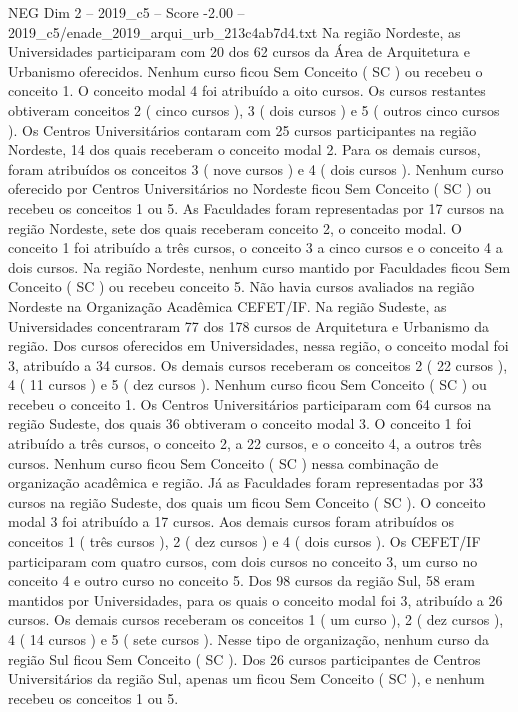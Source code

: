 \begin{textsample}{NEG Dim 2 – 2019\_c5 – Score -2.00 – 2019\_c5/enade\_2019\_arqui\_urb\_213c4ab7d4.txt}
Na região Nordeste, as Universidades participaram com 20 dos 62 cursos da Área de Arquitetura e Urbanismo oferecidos.
Nenhum curso ficou Sem Conceito ( SC ) ou recebeu o conceito 1.
O conceito modal 4 foi atribuído a oito cursos.
Os cursos restantes obtiveram conceitos 2 ( cinco cursos ), 3 ( dois cursos ) e 5 ( outros cinco cursos ).
Os Centros Universitários contaram com 25 cursos participantes na região Nordeste, 14 dos quais receberam o conceito modal 2.
Para os demais cursos, foram atribuídos os conceitos 3 ( nove cursos ) e 4 ( dois cursos ).
Nenhum curso oferecido por Centros Universitários no Nordeste ficou Sem Conceito ( SC ) ou recebeu os conceitos 1 ou 5.
As Faculdades foram representadas por 17 cursos na região Nordeste, sete dos quais receberam conceito 2, o conceito modal.
O conceito 1 foi atribuído a três cursos, o conceito 3 a cinco cursos e o conceito 4 a dois cursos.
Na região Nordeste, nenhum curso mantido por Faculdades ficou Sem Conceito ( SC ) ou recebeu conceito 5.
Não havia cursos avaliados na região Nordeste na Organização Acadêmica CEFET/IF.
Na região Sudeste, as Universidades concentraram 77 dos 178 cursos de Arquitetura e Urbanismo da região.
Dos cursos oferecidos em Universidades, nessa região, o conceito modal foi 3, atribuído a 34 cursos.
Os demais cursos receberam os conceitos 2 ( 22 cursos ), 4 ( 11 cursos ) e 5 ( dez cursos ).
Nenhum curso ficou Sem Conceito ( SC ) ou recebeu o conceito 1.
Os Centros Universitários participaram com 64 cursos na região Sudeste, dos quais 36 obtiveram o conceito modal 3.
O conceito 1 foi atribuído a três cursos, o conceito 2, a 22 cursos, e o conceito 4, a outros três cursos.
Nenhum curso ficou Sem Conceito ( SC ) nessa combinação de organização acadêmica e região.
Já as Faculdades foram representadas por 33 cursos na região Sudeste, dos quais um ficou Sem Conceito ( SC ).
O conceito modal 3 foi atribuído a 17 cursos.
Aos demais cursos foram atribuídos os conceitos 1 ( três cursos ), 2 ( dez cursos ) e 4 ( dois cursos ).
Os CEFET/IF participaram com quatro cursos, com dois cursos no conceito 3, um curso no conceito 4 e outro curso no conceito 5.
Dos 98 cursos da região Sul, 58 eram mantidos por Universidades, para os quais o conceito modal foi 3, atribuído a 26 cursos.
Os demais cursos receberam os conceitos 1 ( um curso ), 2 ( dez cursos ), 4 ( 14 cursos ) e 5 ( sete cursos ).
Nesse tipo de organização, nenhum curso da região Sul ficou Sem Conceito ( SC ).
Dos 26 cursos participantes de Centros Universitários da região Sul, apenas um ficou Sem Conceito ( SC ), e nenhum recebeu os conceitos 1 ou 5.

\end{textsample}
